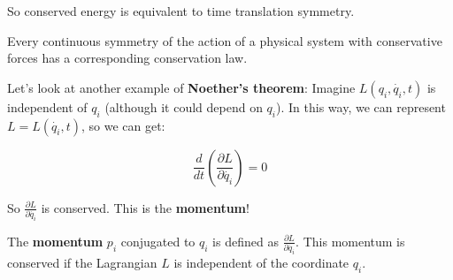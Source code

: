 So conserved energy is equivalent to time translation symmetry.

\begin{definition}
    Every continuous symmetry of the action of a physical system with conservative forces has a corresponding conservation law.
\end{definition}

Let's look at another example of \textbf{Noether's theorem}: Imagine $L(q_i, \dot{q_i}, t)$ is 
independent of $q_i$ (although it could depend on $q_i$). In this way, we can represent 
$L=L(\dot{q_i}, t)$, so we can get:

\[
    \frac{d}{dt} \left(\frac{\partial L}{\partial \dot{q_i}}\right) = 0
\]

So $\frac{\partial L}{\partial \dot{q_i}}$ is conserved. This is the \textbf{momentum}!

\begin{definition}[Momentum]
    The \textbf{momentum} $p_i$ conjugated to $q_i$ is defined as $\frac{\partial L}{\partial \dot{q_i}}$.
    This momentum is conserved if the Lagrangian $L$ is independent of the coordinate $q_i$.
\end{definition}